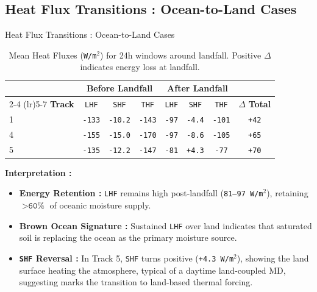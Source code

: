 \documentclass[8pt, aspectratio=169]{beamer}
\begin{document}
\subsection{Heat Flux Transitions : Ocean-to-Land Cases}
\begin{frame}{Heat Flux Transitions : Ocean-to-Land Cases}
    \begin{table}[H]
        \footnotesize
        \centering
        \caption{Mean Heat Fluxes (\texttt{W/m$^2$}) for 24h windows around landfall. Positive $\Delta$ indicates energy loss at landfall.}
        \begin{tabular}{lccccccc}
            \toprule
                           & \multicolumn{3}{c}{\textbf{Before Landfall}} & \multicolumn{3}{c}{\textbf{After Landfall}} &                \\
            \cmidrule(lr){2-4} \cmidrule(lr){5-7}
            \textbf{Track} & \texttt{LHF} & \texttt{SHF} & \texttt{THF} & \texttt{LHF} & \texttt{SHF} & \texttt{THF} & $\Delta$ \textbf{Total} \\
            \midrule
            1              & \texttt{-133} & \texttt{-10.2} & \texttt{-143} & \texttt{-97} & \texttt{-4.4} & \texttt{-101} & \texttt{+42} \\
            4              & \texttt{-155} & \texttt{-15.0} & \texttt{-170} & \texttt{-97} & \texttt{-8.6} & \texttt{-105} & \texttt{+65} \\
            5              & \texttt{-135} & \texttt{-12.2} & \texttt{-147} & \texttt{-81} & \texttt{+4.3} & \texttt{-77}  & \texttt{+70} \\
            \bottomrule
        \end{tabular}
    \end{table}

    \vspace{0.2cm}
    \footnotesize
    \textbf{Interpretation :}
    \begin{itemize}
        \item \textbf{Energy Retention :} \texttt{LHF} remains high post-landfall (\texttt{81--97 W/m$^2$}), retaining $>\texttt{60\%}$ of oceanic moisture supply.
        \item \textbf{Brown Ocean Signature :} Sustained \texttt{LHF} over land indicates that saturated soil is replacing the ocean as the primary moisture source.
        \item \textbf{\texttt{SHF} Reversal :} In Track 5, \texttt{SHF} turns positive (\texttt{+4.3 W/m$^2$}), showing the land surface heating the atmosphere, typical of a daytime land-coupled MD, suggesting marks the transition to land-based thermal forcing.
    \end{itemize}
\end{frame}
\end{document}
